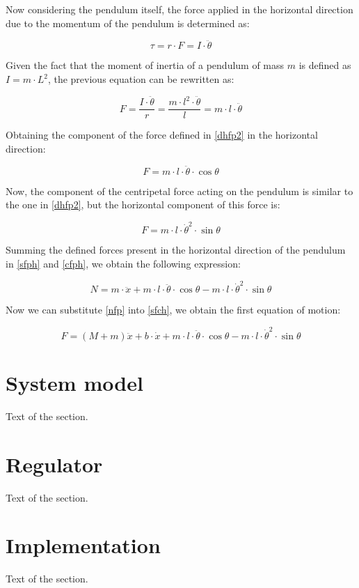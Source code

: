 \documentclass{article}
\begin{document}
Now considering the pendulum itself, the force applied in the horizontal direction due to the momentum of the pendulum is determined as:

\begin{equation} \label{dhfp}
\tau=r\cdot F=I\cdot \ddot{\theta}
\end{equation}

Given the fact that the moment of inertia of a pendulum of mass $m$ is defined as $I=m\cdot L^2$, the previous equation can be rewritten as:

\begin{equation} \label{dhfp2}
F=\frac{I\cdot \ddot{\theta}}{r}=\frac{m\cdot l^2\cdot \ddot{\theta}}{l}=m\cdot l\cdot \ddot{\theta}
\end{equation}

Obtaining the component of the force defined in \ref{dhfp2} in the horizontal direction:

\begin{equation} \label{sfph}
F=m\cdot l\cdot \ddot{\theta}\cdot \cos{\theta}
\end{equation}

Now, the component of the centripetal force acting on the pendulum is similar to the one in \ref{dhfp2}, but the horizontal component of this force is:

\begin{equation} \label{cfph}
F=m\cdot l\cdot \dot{\theta}^2\cdot \sin{\theta}
\end{equation}

Summing the defined forces present in the horizontal direction of the pendulum in \ref{sfph} and \ref{cfph}, we obtain the following expression:

\begin{equation} \label{nfp}
N=m\cdot \ddot{x}+m\cdot l\cdot \ddot{\theta}\cdot \cos{\theta}-m\cdot l\cdot \dot{\theta}^2\cdot \sin{\theta}
\end{equation}

Now we can substitute \ref{nfp} into \ref{sfch}, we obtain the first equation of motion:

\begin{equation} \label{fem}
F=(M+m)\ddot{x}+b\cdot \dot{x}+m\cdot l\cdot \ddot{\theta}\cdot \cos{\theta}-m\cdot l\cdot \dot{\theta}^2\cdot \sin{\theta}
\end{equation}

\section{System model}

Text of the section.

\section{Regulator}

Text of the section.

\section{Implementation}

Text of the section.

\begin{appendix}
	\newpage
	\listoffigures
	\newpage
	\listoftables
\end{appendix}

\newpage
\printbibliography
\end{document}
